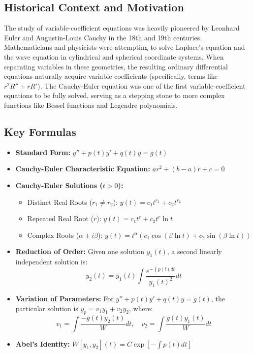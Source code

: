 \documentclass{article}
\begin{document}
\subsection{Historical Context and Motivation}
The study of variable-coefficient equations was heavily pioneered by Leonhard Euler and Augustin-Louis Cauchy in the 18th and 19th centuries. Mathematicians and physicists were attempting to solve Laplace's equation and the wave equation in cylindrical and spherical coordinate systems. When separating variables in these geometries, the resulting ordinary differential equations naturally acquire variable coefficients (specifically, terms like $r^2 R'' + r R'$). The Cauchy-Euler equation was one of the first variable-coefficient equations to be fully solved, serving as a stepping stone to more complex functions like Bessel functions and Legendre polynomials.

\subsection{Key Formulas}
\begin{itemize}
    \item \textbf{Standard Form:} $y'' + p(t)y' + q(t)y = g(t)$
    \item \textbf{Cauchy-Euler Characteristic Equation:} $ar^2 + (b-a)r + c = 0$
    \item \textbf{Cauchy-Euler Solutions ($t > 0$):}
    \begin{itemize}
        \item Distinct Real Roots ($r_1 \neq r_2$): $y(t) = c_1 t^{r_1} + c_2 t^{r_2}$
        \item Repeated Real Root ($r$): $y(t) = c_1 t^r + c_2 t^r \ln t$
        \item Complex Roots ($\alpha \pm i\beta$): $y(t) = t^\alpha (c_1 \cos(\beta \ln t) + c_2 \sin(\beta \ln t))$
    \end{itemize}
    \item \textbf{Reduction of Order:} Given one solution $y_1(t)$, a second linearly independent solution is:
    \[ y_2(t) = y_1(t) \int \frac{e^{-\int p(t) dt}}{y_1(t)^2} dt \]
    \item \textbf{Variation of Parameters:} For $y'' + p(t)y' + q(t)y = g(t)$, the particular solution is $y_p = v_1 y_1 + v_2 y_2$, where:
    \[ v_1 = \int \frac{-g(t)y_2(t)}{W} dt, \quad v_2 = \int \frac{g(t)y_1(t)}{W} dt \]
    \item \textbf{Abel's Identity:} $W[y_1, y_2](t) = C \exp\left[ -\int p(t) dt \right]$
\end{itemize}
\end{document}
